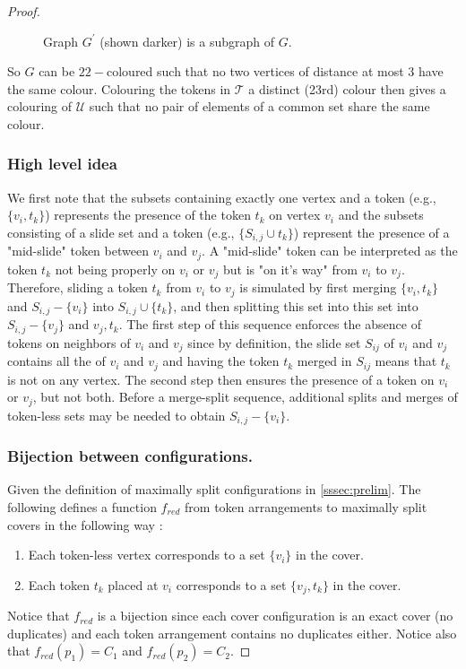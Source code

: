 \begin{proof}
\begin{figure} [H]
\begin{tikzpicture}
  \end{tikzpicture}
  \caption{Graph $G^{'}$ (shown darker) is a subgraph of $G$.}
  \label{fig:subgraph}
\end{figure}


So $G$ can be $22-$coloured such that no two vertices of distance at most $3$ have the same colour. Colouring the tokens in $\mathcal{T}$
a distinct (23rd) colour then gives a colouring of $\mathcal{U}$ such that no pair of elements of a common set share the same colour.

\subsubsection{High level idea}\label{subsubsection:high_level}
We first note that the subsets containing exactly one vertex and a token (e.g., $\{v_i, t_k\}$) represents the presence of the token
$t_k$ on vertex $v_i$ and the subsets consisting of a slide set and a token (e.g., $\{S_{i,j} \cup t_k\}$) represent the presence of a
"mid-slide" token between $v_i$ and $v_j$. A "mid-slide" token can be interpreted as the token $t_k$ not being properly on $v_i$ or $v_j$ but is
"on it's way" from $v_i$ to $v_j$. Therefore, sliding a token $t_k$ from $v_i$ to $v_j$ is simulated by first
merging $\{v_i, t_k\}$ and $S_{i,j}-\{v_i\}$ into $S_{i,j} \cup \{t_k\}$, and then splitting this set into this set into $S_{i,j}-\{v_j\}$
and ${v_j, t_k}$. The first step of this sequence enforces the absence of tokens on neighbors of $v_i$ and $v_j$ since by definition, the slide
set $S_{ij}$ of $v_i$ and $v_j$ contains all the of $v_i$ and $v_j$ and having the token $t_k$  merged in $S_{ij}$ means that $t_k$ is not on any
vertex. The second step then ensures the presence of a token on $v_i$ or $v_j$, but not both.
Before a merge-split sequence, additional splits and merges of token-less sets may be needed to obtain $S_{i,j}-\{v_i\}$.

\subsubsection{Bijection between configurations.}
Given the definition of maximally split configurations in \ref{sssec:prelim}. The following defines a function $f_{red}$ from token arrangements
to maximally split covers in the following way :
\begin{enumerate}
  \item Each token-less vertex corresponds to a set $\{v_i\}$ in the cover.
  \item Each token $t_k$ placed at $v_i$ corresponds to a set $\{v_j, t_k\}$ in the cover.
\end{enumerate}
Notice that $f_{red}$ is a bijection since each cover configuration is an exact cover (no duplicates) and each token
arrangement contains no duplicates either. Notice also that $f_{red}(p_1) = C_1$ and $f_{red}(p_2) = C_2$.



\end{proof}
